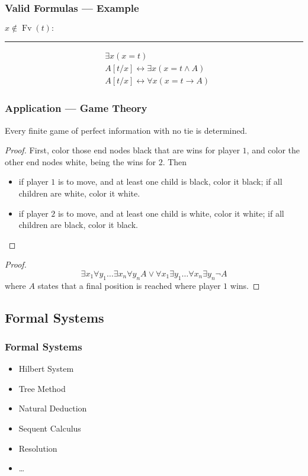 \documentclass[UTF8,aspectratio=43,11pt,colorlinks,compress,openany]{beamer}%
\begin{document}
\begin{frame}\frametitle{Valid Formulas --- Example}
	$x\notin \operatorname{Fv}(t):$
	\hrule
	\begin{align*}
	&\exists x(x=t)\\
	& A[t/x]\leftrightarrow\exists x (x=t\wedge A)\\
	& A[t/x]\leftrightarrow\forall x(x=t\to A)
	\end{align*}
\end{frame}

\begin{frame}\frametitle{Application --- Game Theory}
	\begin{theorem}
		Every finite game of perfect information with no tie is determined.
	\end{theorem}
	\begin{proof}
		First, color those end nodes black that are wins for player $1$, and color the other end nodes white, being the wins for $2$. Then
		\begin{itemize}
			\item if player $1$ is to move, and at least one child is black, color it black; if all children are white, color it white.
			\item if player $2$ is to move, and at least one child is white, color it white; if all children are black, color it black.
		\end{itemize}
	\end{proof}
	\begin{proof}
		\[\exists x_1\forall y_1\dots\exists x_n\forall y_n A\vee\forall x_1\exists y_1\dots\forall x_n\exists y_n\neg A\]
		where $A$ states that a final position is reached where player $1$ wins.
	\end{proof}
\end{frame}

\subsection{Formal Systems}

\begin{frame}\frametitle{Formal Systems}
	\begin{itemize}
		\item Hilbert System
		\item Tree Method
		\item Natural Deduction
		\item Sequent Calculus
		\item Resolution
		\item \dots
	\end{itemize}
\end{frame}
\end{document}
